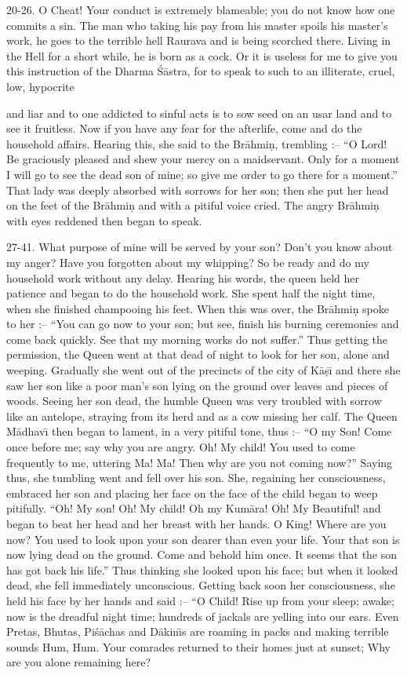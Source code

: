 20-26. O Cheat! Your conduct is extremely blameable; you do not know how one commits a sin. The man who taking his pay from his master spoils his master's work, he goes to the terrible hell Raurava and is being scorched there. Living in the Hell for a short while, he is born as a cock. Or it is useless for me to give you this instruction of the Dharma \'S\=astra, for to speak to such to an illiterate, cruel, low, hypocrite

and liar and to one addicted to sinful acts is to sow seed on an usar land and to see it fruitless. Now if you have any fear for the afterlife, come and do the household affairs. Hearing this, she said to the Br\=ahmi\d{n}, trembling :-- ``O Lord! Be graciously pleased and shew your mercy on a maidservant. Only for a moment I will go to see the dead son of mine; so give me order to go there for a moment.'' That lady was deeply absorbed with sorrows for her son; then she put her head on the feet of the Br\=ahmi\d{n} and with a pitiful voice cried. The angry Br\=ahmi\d{n} with eyes reddened then began to speak.

27-41. What purpose of mine will be served by your son? Don't you know about my anger? Have you forgotten about my whipping? So be ready and do my household work without any delay. Hearing his words, the queen held her patience and began to do the household work. She spent half the night time, when she finished champooing his feet. When this was over, the Br\=ahmi\d{n} spoke to her :-- ``You can go now to your son; but see, finish his burning ceremonies and come back quickly. See that my morning works do not suffer.'' Thus getting the permission, the Queen went at that dead of night to look for her son, alone and weeping. Gradually she went out of the precincts of the city of K\=a\d{s}\={\i} and there she saw her son like a poor man's son lying on the ground over leaves and pieces of woods. Seeing her son dead, the humble Queen was very troubled with sorrow like an antelope, straying from its herd and as a cow missing her calf. The Queen M\=adhav\={\i} then began to lament, in a very pitiful tone, thus :-- ``O my Son! Come once before me; say why you are angry. Oh! My child! You used to come frequently to me, uttering Ma! Ma! Then why are you not coming now?'' Saying thus, she tumbling went and fell over his son. She, regaining her consciousness, embraced her son and placing her face on the face of the child began to weep pitifully. ``Oh! My son! Oh! My child! Oh my Kum\=ara! Oh! My Beautiful! and began to beat her head and her breast with her hands. O King! Where are you now? You used to look upon your son dearer than even your life. Your that son is now lying dead on the ground. Come and behold him once. It seems that the son has got back his life.'' Thus thinking she looked upon his face; but when it looked dead, she fell immediately unconscious. Getting back soon her consciousness, she held his face by her hands and said :-- ``O Child! Rise up from your sleep; awake; now is the dreadful night time; hundreds of jackals are yelling into our ears. Even Pretas, Bhutas, Pi\'s\=achas and D\=akin\={\i}s are roaming in packs and making terrible sounds Hum, Hum. Your comrades returned to their homes just at sunset; Why are you alone remaining here?


